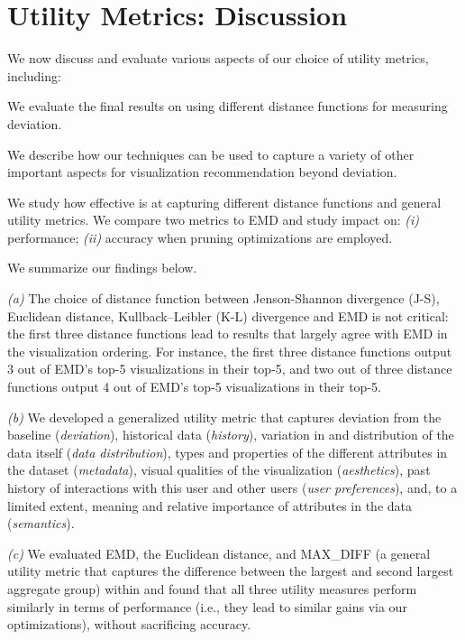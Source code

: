 
\section{Utility Metrics: Discussion}
\label{sec:discussion}
We now discuss and evaluate various aspects of our choice of utility metrics,
including:

 We evaluate the final results on
using different distance functions for measuring deviation.

 We describe how our 
techniques can be used to capture a variety of other important aspects
for visualization recommendation beyond deviation. 

 We study how
effective \SeeDB is at capturing
different distance functions and general utility metrics. We compare two
metrics to EMD and study impact on:
{\it (i)} performance; 
{\it (ii)} accuracy when pruning optimizations are employed.


We summarize our findings below.
\begin{denselist}
\item {\em (a)} The choice of distance function between Jenson-Shannon divergence (J-S), Euclidean distance, Kullback–Leibler (K-L) divergence
and EMD is not critical: the first three distance functions lead
to results that largely
agree with EMD in the visualization ordering. For instance, the
first three distance functions output 3 out of EMD's top-5 visualizations 
in their top-5, and
two out of three distance functions output 4 out of EMD's top-5 visualizations in their top-5.
\item {\em (b)} We developed a generalized utility metric
that captures deviation from the baseline ({\it deviation}),
historical data ({\em history}),
variation in and distribution of the data itself ({\it data distribution}),
types and properties of the different attributes in the dataset ({\it metadata}), 
visual qualities of the visualization ({\it aesthetics}),  
past history of interactions with this user and other users ({\it user preferences}), and,
to a limited extent,
meaning and relative importance of attributes in the data ({\it semantics}).
\item {\em (c)} We evaluated EMD, the Euclidean distance, and MAX\_DIFF
(a general utility metric that captures the difference between the largest
and second largest aggregate group) within \SeeDB and found that
all three utility measures perform similarly in terms of performance 
(i.e., they lead to similar gains via our optimizations),
without sacrificing accuracy. 
\end{denselist}

